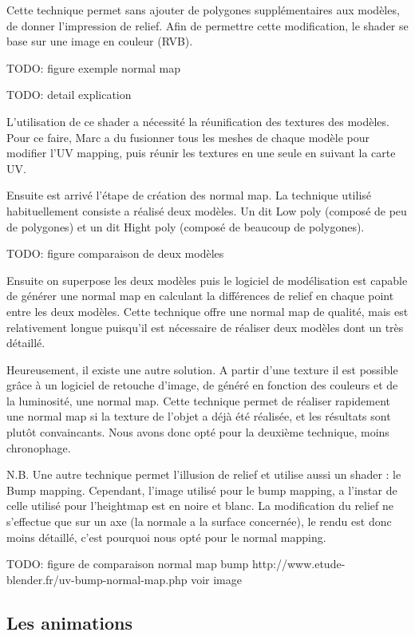 \documentclass[11pt]{report}
\begin{document}
Cette technique permet sans ajouter de polygones supplémentaires aux modèles, de donner l’impression de relief. Afin de permettre cette modification, le shader se base sur une image en couleur (RVB).

TODO: figure exemple normal map

TODO: detail explication

L’utilisation de ce shader a nécessité la réunification des textures des modèles.
Pour ce faire, Marc a du fusionner tous les meshes de chaque modèle pour modifier l’UV mapping, puis réunir les textures en une seule en suivant la carte UV.

Ensuite est arrivé l’étape de création des normal map. La technique utilisé habituellement consiste a réalisé deux modèles. Un dit Low poly (composé de peu de polygones) et un dit Hight poly (composé de beaucoup de polygones).

TODO: figure comparaison de deux modèles

Ensuite on superpose les deux modèles puis le logiciel de modélisation est capable de générer une normal map en calculant la différences de relief en chaque point entre les deux modèles.
Cette technique offre une normal map de qualité, mais est relativement longue puisqu’il est nécessaire de réaliser deux modèles dont un très détaillé.

Heureusement, il existe une autre solution. A partir d’une texture il est possible grâce à un logiciel de retouche d’image, de généré en fonction des couleurs et de la luminosité, une normal map.
Cette technique permet de réaliser rapidement une normal map si la texture de l’objet a déjà été réalisée, et les résultats sont plutôt convaincants. Nous avons donc opté pour la deuxième technique, moins chronophage.

N.B. Une autre technique permet l’illusion de relief et utilise aussi un shader : le Bump mapping.
Cependant, l’image utilisé pour le bump mapping, a l’instar de celle utilisé pour l’heightmap est en noire et blanc. La modification du relief ne s’effectue que sur un axe (la normale a la surface concernée), le rendu est donc moins détaillé, c’est pourquoi nous opté pour le normal mapping.

TODO: figure de comparaison normal map bump http://www.etude-blender.fr/uv-bump-normal-map.php voir image

\subsection{Les animations}
\end{document}
